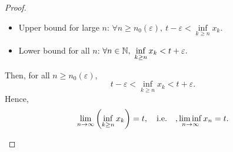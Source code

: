 \documentclass[11pt,openany]{article}
\begin{document}
\begin{proof}
\begin{enumerate}[(1)]
\begin{itemize}
\begin{itemize}
		\item Upper bound for large $n$: $
		\forall n\geq n_0(\varepsilon),\ t-\varepsilon < \inf\limits_{k\geq n}x_k.$
		\item Lower bound for all $n$: $\forall n\in\mathbb{N},\ \inf\limits_{k\geq n} x_k<t+\varepsilon.$
	\end{itemize}
	Then, for all $n\geq n_0(\varepsilon)$, \[
	t-\varepsilon<\inf\limits_{k\geq n} x_k<t+\varepsilon.
	\] Hence, \[
	\lim\limits_{n\to\infty}\left(\inf_{k\geq n} x_k\right)=t,\quad\textnormal{i.e.}\quad,\liminf\limits_{n \to \infty}x_n=t.
	\]
\end{itemize}
\end{enumerate}
\end{proof}

\end{document}
